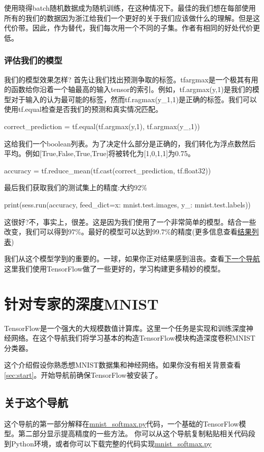 使用晓得batch随机数据成为随机训练，在这种情况下。最佳的我们想在每部使用所有的我们的数据因为浙江给我们一个更好的关于我们应该做什么的理解。但是这代价带。因此，作为替代，我们每次用一个不同的子集。作者有相同的好处代价更低。
\subsubsection{评估我们的模型}
我们的模型效果怎样?
首先让我们找出预测争取的标签。tfargmax是一个极其有用的函数给你沿着一个轴最高的输入tensor的索引。例如，tf.argmax(y,1)是我们的模型对于输入的认为最可能的标签，然而tf.ragmax(y\_1,1)是正确的标签。我们可以使用tf.equal检查是否我们的预测和真实情况匹配。
\begin{pythoncode}
correct_prediction = tf.equal(tf.argmax(y,1), tf.argmax(y_,1))
\end{pythoncode}
这给我们一个boolean列表。为了决定什么部分是正确的，我们转化为浮点数然后平均。例如[True,False,True,True]将被转化为[1,0,1,1]为0.75。
\begin{pythoncode}
accuracy = tf.reduce_mean(tf.cast(correct_prediction, tf.float32))
\end{pythoncode}
最后我们获取我们的测试集上的精度:大约92\%
\begin{pythoncode}
print(sess.run(accuracy, feed_dict={x: mnist.test.images, y_: mnist.test.labels}))
\end{pythoncode}
这很好?不，事实上，很差。这是因为我们使用了一个非常简单的模型。结合一些改变，我们可以得到97\%。最好的模型可以达到99.7\%的精度(更多信息查看\href{https://rodrigob.github.io/are_we_there_yet/build/classification_datasets_results}{结果列表})

我们从这个模型学到的重要的。一球，如果你正对结果感到沮丧。查看\href{https://www.tensorflow.org/get_started/mnist/pros}{下一个导航}这里我们使用TensorFlow做了一些更好的，学习构建更多精妙的模型。
\section{针对专家的深度MNIST}
TensorFlow是一个强大的大规模数值计算库。这里一个任务是实现和训练深度神经网络。在这个导航我们将学习基本的构造TensorFlow模块构造深度卷积MNIST分类器。

这个介绍假设你熟悉想MNIST数据集和神经网络。如果你没有相关背景查看\ref{sec:start}。开始导航前确保TensorFlow被安装了。

\subsection{关于这个导航}
这个导航的第一部分解释在\href{https://www.github.com/tensorflow/tensorflow/blob/r1.4/tensorflow/examples/tutorials/mnist/mnist_softmax.py}{mnist\_softmax.py}代码，一个基础的TensorFlow模型。第二部分显示提高精度的一些方法。
你可以从这个导航复制粘贴相关代码段到Python环境，或者你可以下载完整的代码实现\href{https://www.github.com/tensorflow/tensorflow/blob/r1.4/tensorflow/examples/tutorials/mnist/mnist_softmax.py}{mnist_softmax.py}

